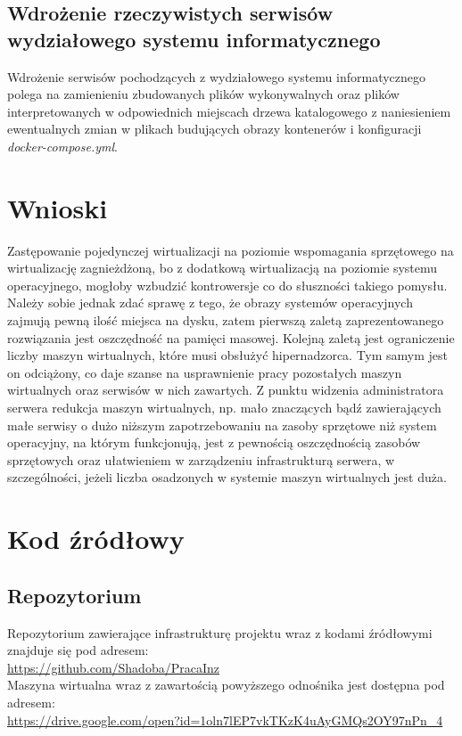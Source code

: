 \documentclass[polish, a4paper, 12pt, oneside]{book}
\begin{document}
	\section{Wdrożenie rzeczywistych serwisów wydziałowego systemu informatycznego}
	Wdrożenie serwisów pochodzących z wydziałowego systemu informatycznego polega na zamienieniu zbudowanych plików wykonywalnych oraz plików interpretowanych w odpowiednich miejscach drzewa katalogowego z naniesieniem ewentualnych zmian w plikach budujących obrazy kontenerów i konfiguracji \textit{docker-compose.yml}.
	
	\chapter{Wnioski}
	Zastępowanie pojedynczej wirtualizacji na poziomie wspomagania sprzętowego na wirtualizację zagnieżdżoną, bo z dodatkową wirtualizacją na poziomie systemu operacyjnego, mogłoby wzbudzić kontrowersje co do słuszności takiego pomysłu. Należy sobie jednak zdać sprawę z tego, że obrazy systemów operacyjnych zajmują pewną ilość miejsca na dysku, zatem pierwszą zaletą zaprezentowanego rozwiązania jest oszczędność na pamięci masowej. Kolejną zaletą jest ograniczenie liczby maszyn wirtualnych, które musi obsłużyć hipernadzorca. Tym samym jest on odciążony, co daje szanse na usprawnienie pracy pozostałych maszyn wirtualnych oraz serwisów w nich zawartych. Z punktu widzenia administratora serwera redukcja maszyn wirtualnych, np. mało znaczących bądź zawierających małe serwisy o dużo niższym zapotrzebowaniu na zasoby sprzętowe niż system operacyjny, na którym funkcjonują, jest z pewnością oszczędnością zasobów sprzętowych oraz ułatwieniem w zarządzeniu infrastrukturą serwera, w szczególności, jeżeli liczba osadzonych w systemie maszyn wirtualnych jest duża.
	
	
	\chapter{Kod źródłowy}
	
	\section{Repozytorium}
	Repozytorium zawierające infrastrukturę projektu wraz z kodami źródłowymi znajduje się pod adresem:\\
	\url{https://github.com/Shadoba/PracaInz}\\
	Maszyna wirtualna wraz z zawartością powyższego odnośnika jest dostępna pod adresem:\\
	\url{https://drive.google.com/open?id=1oln7lEP7vkTKzK4uAyGMQs2OY97nPn_4}
	
\end{document}
